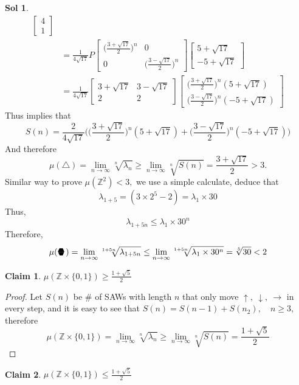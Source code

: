 \documentclass[12pt,a4paper]{report}
\theoremstyle{definition}
\newtheorem*{claim}{Claim}
\newtheorem*{sol}{Sol}
\newcommand{\sixedge}{\mbox{\parbox[t][-2pt][c]{10pt}{\scriptsize$\blacktriangledown\hspace{-3.6pt}\blacktriangle\hspace{-4pt}\blacktriangledown$}\hspace{-10.2pt}\parbox[b][10.7pt][c]{10pt}{\scriptsize$\blacktriangle\hspace{-3.6pt}\blacktriangledown\hspace{-3.6pt}\blacktriangle$}}}
\begin{document}
\begin{sol}
\begin{align*}
\begin{bmatrix}
    		4\\
    		1
    		\end{bmatrix}\\
    		&=\frac{1}{4\sqrt{17}}P\begin{bmatrix}
    		\big(\frac{3+\sqrt{17}}{2}\big)^n & 0\\
    		0 & \big(\frac{3-\sqrt{17}}{2}\big)^n
    		\end{bmatrix}\begin{bmatrix}
    		5+\sqrt{17}\\
    		-5+\sqrt{17}
    		\end{bmatrix}\\
    		&=\frac{1}{4\sqrt{17}}\begin{bmatrix}
    		3+\sqrt{17} & 3-\sqrt{17}\\
    		2 & 2
    		\end{bmatrix}\begin{bmatrix}
    		\big(\frac{3+\sqrt{17}}{2}\big)^n(5+\sqrt{17})\\[3pt]
    		\big(\frac{3-\sqrt{17}}{2}\big)^n(-5+\sqrt{17})
    		\end{bmatrix}
		\end{align*}
		Thus implies that
		\[
		S(n)=\frac{2}{4\sqrt{17}}\bigg(\Big(\frac{3+\sqrt{17}}{2}\Big)^n(5+\sqrt{17})+\Big(\frac{3-\sqrt{17}}{2}\Big)^n(-5+\sqrt{17})\bigg)
		\]
		And therefore
		\[
		\mu(\triangle)=\lim_{n\to\infty}\sqrt[n]{\lambda_n}\geq \lim_{n\to\infty}\sqrt[n]{S(n)}=\frac{3+\sqrt{17}}{2}>3.
		\]
		Similar way to prove $\mu(\mathbb{Z}^2)<3,$ we use a simple calculate, deduce that 
		\[
		\lambda_{1+5}=(3\times 2^5-2)=\lambda_1\times 30
		\]
		Thus,
		\[
		\lambda_{1+5n}\leq \lambda_1\times 30^{n}
		\]
		Therefore,
		\[
		\mu(\sixedge)=\lim_{n\to\infty}\sqrt[1+5n]{\lambda_{1+5n}}\leq \lim_{n\to\infty}\sqrt[1+5n]{\lambda_1\times 30^n}=\sqrt[5]{30}<2
		\]
		\begin{claim} $\mu(\mathbb{Z}\times\{0,1\})\geq \frac{1+\sqrt{5}}{2}$ \end{claim}
		\begin{proof}
		Let $S(n)$ be \# of SAWs with length $n$ that only move $\uparrow,\ \downarrow,\ \rightarrow$ in every step, and it is easy to see that $S(n)=S(n-1)+S(n_2),\quad n\geq 3,$ therefore
		\[
		\mu(\mathbb{Z}\times\{0,1\})=\lim_{n\to\infty}\sqrt[n]{\lambda_n}\geq\lim_{n\to\infty}\sqrt[n]{S(n)}=\frac{1+\sqrt{5}}{2}
		\]
		\end{proof}
		\begin{claim} $\mu(\mathbb{Z}\times\{0,1\})\leq\frac{1+\sqrt{5}}{2}$ \end{claim}

\end{sol}
\end{document}
